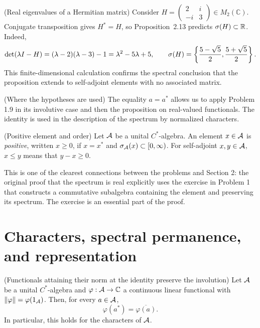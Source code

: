 \begin{cthejemplo}{(Real eigenvalues of a Hermitian matrix)}
Consider $H=\begin{pmatrix}2&i\\-i&3\end{pmatrix}\in M_2(\mathbb C)$.
Conjugate transposition gives $H^*=H$, so Proposition~2.13 predicts
$\sigma(H)\subset\mathbb R$. Indeed,
\[
 \det(\lambda I-H)=(\lambda-2)(\lambda-3)-1
 =\lambda^2-5\lambda+5,
 \qquad
 \sigma(H)=\left\{\frac{5-\sqrt5}{2},\frac{5+\sqrt5}{2}\right\}.
\]
This finite-dimensional calculation confirms the spectral conclusion
that the proposition extends to self-adjoint elements with no associated matrix.
\end{cthejemplo}

\begin{cthnota}{(Where the hypotheses are used)}
The equality $a=a^*$ allows us to apply Problem 1.9 in its involutive case
and then the proposition on real-valued functionals. The identity is used
in the description of the spectrum by normalized characters.
\end{cthnota}


\begin{cthdefinicion}{(Positive element and order)}
Let $\mathcal A$ be a unital $C^*$-algebra. An element $x\in\mathcal A$ is \emph{positive},
written $x\ge0$, if $x=x^*$ and $\sigma_\mathcal A(x)\subset[0,\infty)$.
For self-adjoint $x,y\in\mathcal A$, $x\le y$ means that $y-x\ge0$.
\end{cthdefinicion}

\begin{puente}
This is one of the clearest connections between the problems and Section 2:
the original proof that the spectrum is real explicitly uses the exercise in
Problem 1 that constructs a commutative subalgebra containing the element and
preserving its spectrum. The exercise is an essential part of the proof.
\end{puente}

\section{Characters, spectral permanence, and representation}

\begin{cthcorolario}{(Functionals attaining their norm at the identity preserve the involution)}
Let $\mathcal A$ be a unital $C^*$-algebra and $\varphi:\mathcal A\to\mathbb C$ a continuous
linear functional with $\|\varphi\|=\varphi(1_\mathcal A)$. Then, for every $a\in\mathcal A$,
\[
 \varphi(a^*)=\overline{\varphi(a)}.
\]
In particular, this holds for the characters of $\mathcal A$.
\end{cthcorolario}

